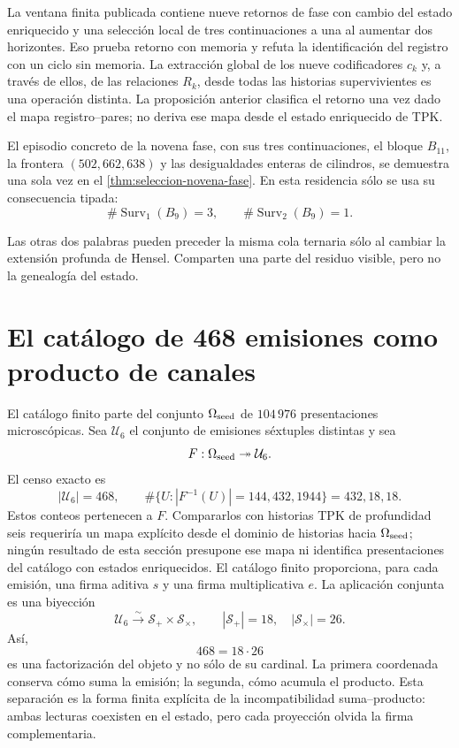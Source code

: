 La ventana finita publicada contiene nueve retornos de fase con cambio del
estado enriquecido y una selección local de tres continuaciones a una al
aumentar dos horizontes. Eso prueba retorno con memoria y refuta la
identificación del registro con un ciclo sin memoria. La extracción global de
los nueve codificadores \(c_k\) y, a través de ellos, de las relaciones
\(R_k\), desde todas las historias supervivientes es una operación distinta.
La proposición anterior clasifica el retorno una vez dado el mapa
registro--pares; no deriva ese mapa desde el estado enriquecido de TPK.

El episodio concreto de la novena fase, con sus tres continuaciones, el
bloque \(B_{11}\), la frontera \((502,662,638)\) y las desigualdades enteras
de cilindros, se demuestra una sola vez en el
\cref{thm:seleccion-novena-fase}. En esta residencia sólo se usa su
consecuencia tipada:
\[
\#\operatorname{Surv}_{1}(B_9)=3,\qquad
\#\operatorname{Surv}_{2}(B_9)=1.
\]

Las otras dos palabras pueden preceder la misma cola ternaria sólo al cambiar
la extensión profunda de Hensel. Comparten una parte del residuo visible,
pero no la genealogía del estado.

\section{El catálogo de 468 emisiones como producto de canales}

El catálogo finito parte del conjunto
\(\Omega_{\rm seed}\) de \(104\,976\) presentaciones microscópicas. Sea
\(\mathcal U_6\) el conjunto de emisiones séxtuples distintas y sea
\[
 F:\Omega_{\rm seed}\twoheadrightarrow\mathcal U_6.
\]
El censo exacto es
\[
 |\mathcal U_6|=468,
 \qquad
 \#\{U:|F^{-1}(U)|=144,432,1944\}=432,18,18.
\]
Estos conteos pertenecen a \(F\). Compararlos con historias TPK de
profundidad seis requeriría un mapa explícito desde el dominio de historias
hacia \(\Omega_{\rm seed}\); ningún resultado de esta sección presupone ese
mapa ni identifica presentaciones del catálogo con estados enriquecidos.
El catálogo finito proporciona, para cada emisión, una firma aditiva
\(s\) y una firma multiplicativa \(e\). La aplicación conjunta es una
biyección
\[
 \mathcal U_6\xrightarrow{\sim}
 \mathcal S_+\times\mathcal S_\times,
 \qquad
 |\mathcal S_+|=18,
 \quad
 |\mathcal S_\times|=26.
\]
Así,
\[
 \boxed{468=18\cdot26}
\]
es una factorización del objeto y no sólo de su cardinal. La primera
coordenada conserva cómo suma la emisión; la segunda, cómo acumula el
producto. Esta separación es la forma finita explícita de la
incompatibilidad suma--producto: ambas lecturas coexisten en el estado, pero
cada proyección olvida la firma complementaria.

